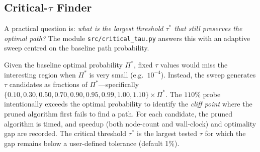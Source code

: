 \begin{table}[htbp]
\centering
\renewcommand{\arraystretch}{1.3}
\caption[Algorithm comparison]{Comparison of baseline and pruned Dijkstra.}
\label{table:algo_compare}
\end{table}

\subsection{Critical-\texorpdfstring{$\tau$}{tau} Finder}
\label{sec:critical_tau}

A practical question is: \emph{what is the largest threshold $\tau^*$ that still preserves the optimal path?} The module \texttt{src/critical\_tau.py} answers this with an adaptive sweep centred on the baseline path probability.

Given the baseline optimal probability $\Pi^*$, fixed $\tau$ values would miss the interesting region when $\Pi^*$ is very small (e.g.\ $10^{-4}$). Instead, the sweep generates $\tau$ candidates as fractions of $\Pi^*$---specifically $\{0.10, 0.30, 0.50, 0.70, 0.90, 0.95, 0.99, 1.00, 1.10\} \times \Pi^*$. The $110\%$ probe intentionally exceeds the optimal probability to identify the \emph{cliff point} where the pruned algorithm first fails to find a path. For each candidate, the pruned algorithm is timed, and speedup (both node-count and wall-clock) and optimality gap are recorded. The critical threshold $\tau^*$ is the largest tested $\tau$ for which the gap remains below a user-defined tolerance (default 1\%).

